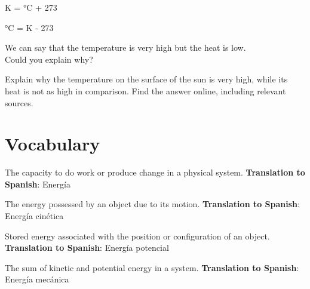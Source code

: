 \begin{centeredequation}
    \unit{\kelvin} = \unit{\degreeCelsius} + 273
\end{centeredequation}
\begin{centeredequation}
    \unit{\degreeCelsius} = \unit{\kelvin} - 273
\end{centeredequation}

\begin{remark}
    We can say that the temperature is very high but the heat is low.\\
    Could you explain why?
\end{remark}

\begin{exercise}
    Explain why the temperature on the surface of the sun is very high, while its heat is not as high in comparison.
    Find the answer online, including relevant sources.
\end{exercise}

\section{Vocabulary}


\begin{vocabulary}[Energy]
The capacity to do work or produce change in a physical system. \newline
\textbf{Translation to Spanish}: Energía \newline
\end{vocabulary}


\begin{vocabulary}
The energy possessed by an object due to its motion. \newline
\textbf{Translation to Spanish}: Energía cinética \newline
\end{vocabulary}


\begin{vocabulary}
Stored energy associated with the position or configuration of an object. \newline
\textbf{Translation to Spanish}: Energía potencial \newline
\end{vocabulary}


\begin{vocabulary}
The sum of kinetic and potential energy in a system. \newline
\textbf{Translation to Spanish}: Energía mecánica \newline
\end{vocabulary}


